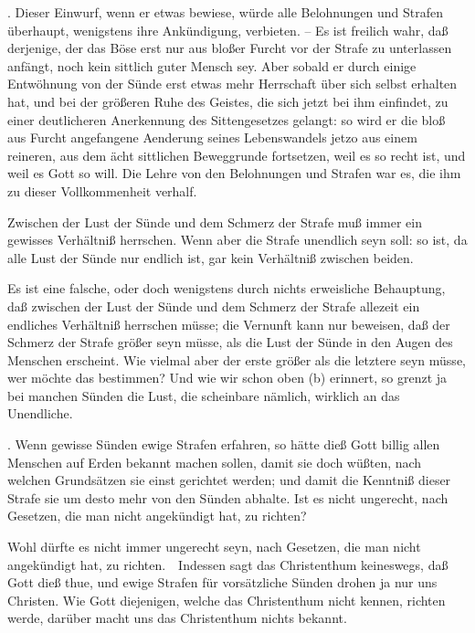 \begin{aufza}
\begin{aufzb}
\begin{aufzc}
. Dieser Einwurf, wenn er etwas bewiese, würde alle Belohnungen und Strafen überhaupt, wenigstens ihre Ankündigung, verbieten. -- Es ist freilich wahr, daß derjenige, der das Böse erst nur aus bloßer Furcht vor der Strafe zu unterlassen anfängt, noch kein sittlich guter Mensch sey. Aber sobald er durch einige Entwöhnung von der Sünde erst etwas mehr Herrschaft über sich selbst erhalten hat, und bei der größeren Ruhe des Geistes, die sich jetzt bei ihm einfindet, zu einer deutlicheren Anerkennung des Sittengesetzes gelangt: so wird er die bloß aus Furcht angefangene Aenderung seines Lebenswandels jetzo aus einem reineren, aus dem ächt sittlichen Beweggrunde fortsetzen, weil es so recht ist, und weil es Gott so will. Die Lehre von den Belohnungen und Strafen war es, die ihm zu dieser Vollkommenheit verhalf.
\item {} Zwischen der Lust der Sünde und dem Schmerz der Strafe muß immer ein gewisses Verhältniß herrschen. Wenn aber die Strafe unendlich seyn soll: so ist, da alle Lust der Sünde nur endlich ist, gar kein Verhältniß zwischen beiden.\par
{} Es ist eine falsche, oder doch wenigstens durch nichts erweisliche Behauptung, daß zwischen der Lust der Sünde und dem Schmerz der Strafe allezeit ein endliches Verhältniß herrschen müsse; die Vernunft kann nur beweisen, daß der Schmerz der Strafe größer seyn müsse, als die Lust der Sünde in den Augen des Menschen erscheint. Wie vielmal aber der erste größer als die letztere seyn müsse, wer möchte das bestimmen? Und wie wir schon oben (b) erinnert, so grenzt ja bei manchen Sünden die Lust, die scheinbare nämlich, wirklich an das Unendliche.
\item {}. Wenn gewisse Sünden ewige Strafen erfahren, so hätte dieß Gott billig allen Menschen auf Erden bekannt machen sollen, damit sie doch wüßten, nach welchen Grundsätzen sie einst gerichtet werden; und damit die Kenntniß dieser Strafe sie um desto mehr von den Sünden abhalte. Ist es nicht ungerecht, nach Gesetzen, die man nicht angekündigt hat, zu richten?\par
{} Wohl dürfte es nicht immer ungerecht seyn, nach Gesetzen, die man nicht angekündigt hat, zu richten.~\ Indessen sagt das Christenthum keineswegs, daß Gott dieß thue, und ewige Strafen für vorsätzliche Sünden drohen ja nur uns Christen. Wie Gott diejenigen, welche das Christenthum nicht kennen, richten werde, darüber macht uns das Christenthum nichts bekannt.

\end{aufzc}
\end{aufzb}
\end{aufza}
